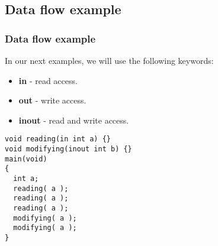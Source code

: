\subsection{Data flow example}
\begin{frame}[fragile]
  \frametitle{Data flow example}
  In our next examples, we will use the following keywords:
  \begin{itemize}
  \item \textbf{in} - read access.
  \item \textbf{out} - write access.
  \item \textbf{inout} - read and write access.
  \end{itemize}
\begin{block}{}
\begin{lstlisting}
void reading(in int a) {}
void modifying(inout int b) {}
main(void)
{
  int a;
  reading( a );
  reading( a );
  reading( a );
  modifying( a );
  modifying( a );
}
\end{lstlisting}
\end{block}
\end{frame}
